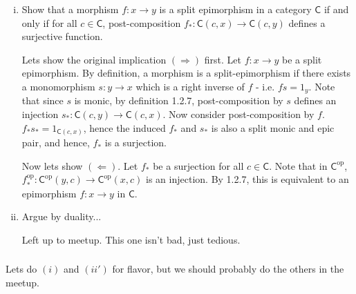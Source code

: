 \documentclass[10pt, oneside]{article}   	%
\newcommand{\cat}[1]{\bm{ \mathsf{#1} }}
\newcommand{\cc}{\cat{C}}
\newcommand{\op}[1]{#1^{\text{op}}}
\newcommand{\opc}{\op{\cc}}
\begin{document}
\subsubsection{}
\begin{enumerate}[(i)]

\item Show that a morphism $f: x \to y$ is a split epimorphism in a category $\cc$ if and only if for all $c \in \cc$, post-composition $f_*: \cc(c,x) \to \cc(c,y)$ defines a surjective function. 

Lets show the original implication $(\Rightarrow)$ first. Let $f : x \to y$ be a split epimorphism. By definition, a morphism is a split-epimorphism if there exists a monomorphism $s : y \to x$ which is a right inverse of $f$ - i.e. $fs = 1_y$.  Note that since $s$ is monic, by definition 1.2.7, post-composition by $s$ defines an injection $s_* : \cc(c,y) \to \cc(c, x)$. Now consider post-composition by $f$. $f_*s_* = 1_{\cc(c,x)}$, hence the induced $f_*$ and $s_*$ is also a split monic and epic pair, and hence, $f_*$ is a surjection. 

Now lets show $(\Leftarrow)$. Let $f_*$ be a surjection for all $c \in \cc$. Note that in $\opc$, $\op{f_*} : \opc(y,c) \to \opc(x,c)$ is an injection. By 1.2.7, this is equivalent to an epimorphism $f: x \to y$ in $\cc$.

\item Argue by duality... 

Left up to meetup. This one isn't bad, just tedious.

\end{enumerate}

\subsubsection{}

Lets do $(i)$ and $(ii')$ for flavor, but we should probably do the others in the meetup.
\end{document}
